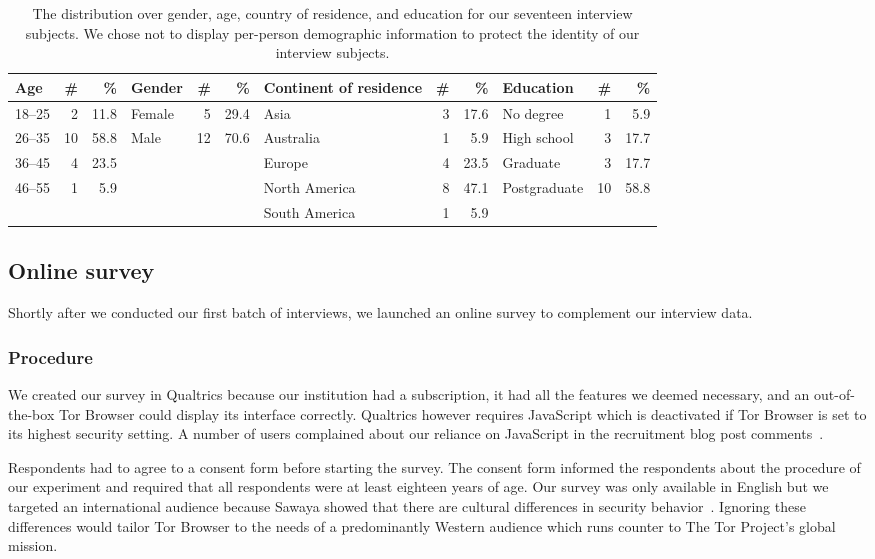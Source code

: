 \begin{table*}[ht]
	\centering
	\begin{tabular}{l r r | l r r | l r r | l r r}
	\toprule
	Age & \# & \% &
	Gender & \# & \% &
	Continent of residence & \# & \% &
	Education & \# & \% \\
	\midrule
	18--25 & 2  & 11.8 & Female & 5  & 29.4 & Asia          & 3 & 17.6 & No degree    & 1  & 5.9 \\
	26--35 & 10 & 58.8 & Male   & 12 & 70.6 & Australia     & 1 &  5.9 & High school  & 3  & 17.7 \\
	36--45 & 4  & 23.5 &        &    &      & Europe        & 4 & 23.5 & Graduate     & 3  & 17.7 \\
	46--55 & 1  & 5.9  &        &    &      & North America & 8 & 47.1 & Postgraduate & 10 & 58.8 \\
	       &    &      &        &    &      & South America & 1 &  5.9 & & & \\
	\bottomrule
	\end{tabular}
	\caption{The distribution over gender, age, country of residence, and
	education for our seventeen interview subjects.  We chose not to display
	per-person demographic information to protect the identity of our interview
	subjects.}
	\label{tab:interviewees}
\end{table*}

\subsection{Online survey}
\label{sec:online-survey}

Shortly after we conducted our first batch of interviews, we launched an online
survey to complement our interview data.

\subsubsection{Procedure}

We created our survey in Qualtrics because our institution had a subscription,
it had all the features we deemed necessary, and an out-of-the-box Tor Browser
could display its interface correctly.  Qualtrics however requires JavaScript
which is deactivated if Tor Browser is set to its highest security setting.  A
number of users complained about our reliance on JavaScript in the recruitment
blog post comments~\cite{Winter2017a}.

Respondents had to agree to a consent form before starting the survey. The
consent form informed the respondents about the procedure of our experiment and
required that all respondents were at least eighteen years of age.  Our survey
was only available in English but we targeted an international audience because
Sawaya \ea showed that there are cultural differences in security
behavior~\cite{Sawaya2017a}.  Ignoring these differences would tailor Tor
Browser to the needs of a predominantly Western audience which runs counter to
The Tor Project's global mission.

